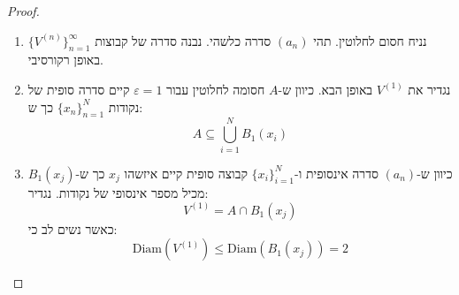 \documentclass{tstextbook}
\begin{document}
\begin{proof}
  \begin{enumerate}
    \item נניח חסום לחלוטין. תהי \((a_{n})\) סדרה כלשהי. נבנה סדרה של קבוצות \(\{ V^{(n)} \}_{n=1}^{\infty}\) באופן רקורסיבי. 


    \item נגדיר את \(V^{(1)}\) באופן הבא. כיוון ש-\(A\) חסומה לחלוטין עבור \(\varepsilon=1\) קיים סדרה סופית של נקודות \(\{ x_{n} \}_{n=1}^{N}\) כך ש: 
$$A\subseteq \bigcup_{i=1}^{N}B_{1}(x_{i})$$


    \item כיוון ש-\((a_{n})\) סדרה אינסופית ו-\(\{ x_{i} \}_{i=1}^{N}\) קבוצה סופית קיים איזשהו \(x_{j}\) כך ש-\(B_{1}(x_{j})\) מכיל מספר אינסופי של נקודות. נגדיר: 
$$V^{(1)}=A\cap  B_{1}(x_{j})$$
כאשר נשים לב כי:
$$\mathrm{Diam}(V^{(1)})\leq \mathrm{Diam}(B_{1}(x_{j}))=2$$


  \end{enumerate}
\end{proof}
\end{document}
